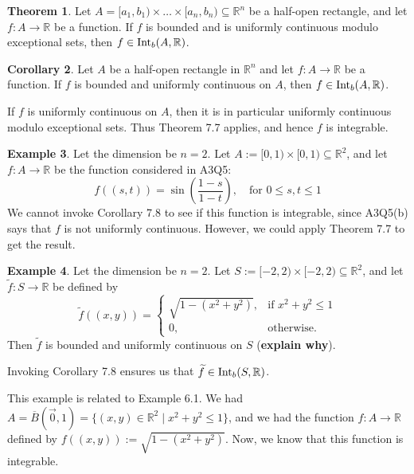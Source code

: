 \documentclass[11pt]{article}
\makeatletter
\theoremstyle{definition}
\newtheorem{thm}{Theorem}[section]
\newtheorem{exmp}[thm]{Example}
\newtheorem{cor}[thm]{Corollary}
\newcommand{\R}{\ensuremath{\mathbb{R}}}
\newenvironment{pf}[1][\proofname]{\par
  \pushQED{\qed}%
  \normalfont \topsep0\p@\relax
  \trivlist
  \item[\hskip\labelsep\itshape
  #1\@addpunct{.}]\ignorespaces
}{%
  \popQED\endtrivlist\@endpefalse
}
\makeatother
\begin{document}
\begin{thm}
Let $A = [a_1, b_1) \times \dots \times [a_n, b_n) \subseteq \R^n$ be a half-open rectangle, and let $f: A \to \R$ be a function. If $f$ is bounded and is uniformly continuous modulo exceptional sets, then $f \in {\rm Int}_b(A, \R)$.
\end{thm}

\begin{cor}
Let $A$ be a half-open rectangle in $\R^n$ and let $f : A \to \R$ be a function. If $f$ is bounded and uniformly continuous on $A$, then $f \in {\rm Int}_b(A, \R)$. 
\end{cor}
\begin{pf}
If $f$ is uniformly continuous on $A$, then it is in particular uniformly continuous modulo exceptional sets. Thus Theorem 7.7 applies, and hence $f$ is integrable.
\end{pf}

\begin{exmp}
Let the dimension be $n = 2$. Let $A := [0, 1) \times [0, 1) \subseteq \R^2$, and let $f : A \to \R$ be the function considered in A3Q5:
$$f\left( (s, t) \right) = \sin \left(\frac{1-s}{1-t}\right), \quad \text{for } 0 \leq s, t \leq 1$$
We cannot invoke Corollary 7.8 to see if this function is integrable, since A3Q5(b) says that $f$ is not uniformly continuous. However, we could apply Theorem 7.7 to get the result.
\end{exmp}

\begin{exmp} 
Let the dimension be $n = 2$. Let $S := [-2, 2) \times [-2, 2) \subseteq \R^2$, and let $\widetilde{f} : S \to \R$ be defined by
$$\widetilde{f} \left( (x, y) \right) = \begin{cases} \sqrt{1 - (x^2 + y^2)}, & \text{if } x^2 + y^2 \leq 1 \\ 0, & \text{otherwise.} \end{cases}$$
Then $\widetilde{f}$ is bounded and uniformly continuous on $S$ ({\bf explain why}). 

Invoking Corollary 7.8 ensures us that $\widetilde{f} \in {\rm Int}_b(S, \R)$.

This example is related to Example 6.1. We had $A = \overline{B}(\vec{0}, 1) = \{(x, y) \in \R^2 \mid x^2 + y^2 \leq 1\}$, and we had the function $f: A \to \R$ defined by $f\left( (x, y) \right) := \sqrt{1 - (x^2 + y^2)}$. Now, we know that this function is integrable. 
\end{exmp}
\end{document}
